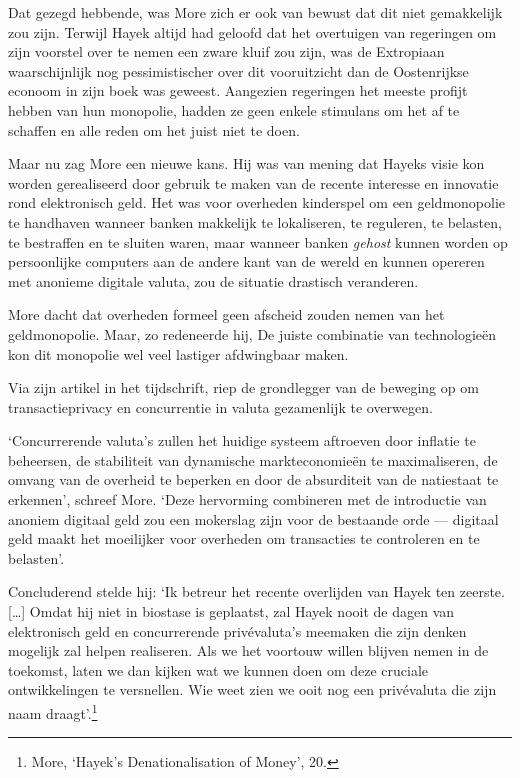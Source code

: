 \documentclass[smalldemyvopaper,11pt,twoside,onecolumn,openright,extrafontsizes,hidelinks]{memoir}
\begin{document}
Dat gezegd hebbende, was More zich er ook van bewust dat dit niet
gemakkelijk zou zijn. Terwijl Hayek altijd had geloofd dat het
overtuigen van regeringen om zijn voorstel over te nemen een zware kluif
zou zijn, was de Extropiaan waarschijnlijk nog pessimistischer over dit
vooruitzicht dan de Oostenrijkse econoom in zijn boek was geweest.
Aangezien regeringen het meeste profijt hebben van hun monopolie, hadden
ze geen enkele stimulans om het af te schaffen en alle reden om het
juist niet te doen.

Maar nu zag More een nieuwe kans. Hij was van mening dat Hayeks visie
kon worden gerealiseerd door gebruik te maken van de recente interesse
en innovatie rond elektronisch geld. Het was voor overheden kinderspel
om een geldmonopolie te handhaven wanneer banken makkelijk te
lokaliseren, te reguleren, te belasten, te bestraffen en te sluiten
waren, maar wanneer banken \emph{gehost} kunnen worden op persoonlijke
computers aan de andere kant van de wereld en kunnen opereren met
anonieme digitale valuta, zou de situatie drastisch veranderen.

More dacht dat overheden formeel geen afscheid zouden nemen van het
geldmonopolie. Maar, zo redeneerde hij, De juiste combinatie van
technologieën kon dit monopolie wel veel lastiger afdwingbaar maken.

Via zijn artikel in het tijdschrift, riep de grondlegger van de beweging
op om transactieprivacy en concurrentie in valuta gezamenlijk te
overwegen.

`Concurrerende valuta's zullen het huidige systeem aftroeven door
inflatie te beheersen, de stabiliteit van dynamische markteconomieën te
maximaliseren, de omvang van de overheid te beperken en door de
absurditeit van de natiestaat te erkennen', schreef More. `Deze
hervorming combineren met de introductie van anoniem digitaal geld zou
een mokerslag zijn voor de bestaande orde --- digitaal geld maakt het
moeilijker voor overheden om transacties te controleren en te belasten'.

Concluderend stelde hij: `Ik betreur het recente overlijden van Hayek
ten zeerste. {[}\ldots{]} Omdat hij niet in biostase is geplaatst, zal
Hayek nooit de dagen van elektronisch geld en concurrerende
privévaluta's meemaken die zijn denken mogelijk zal helpen realiseren.
Als we het voortouw willen blijven nemen in de toekomst, laten we dan
kijken wat we kunnen doen om deze cruciale ontwikkelingen te versnellen.
Wie weet zien we ooit nog een privévaluta die zijn naam
draagt'.\footnote{More, `Hayek's Denationalisation of Money', 20.}
\end{document}

